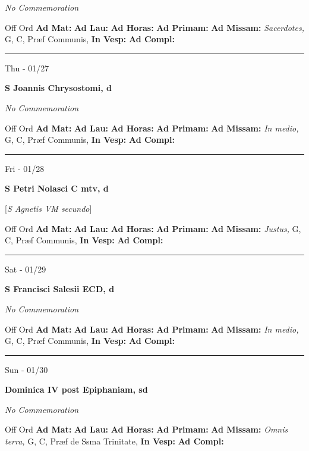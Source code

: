 \documentclass[letterpaper, 10pt]{article}
\begin{document}
\textit{No Commemoration}\begin{justify}
Off Ord
\textbf{Ad Mat: }
\textbf{Ad Lau: }
\textbf{Ad Horas: }
\textbf{Ad Primam: }
\textbf{Ad Missam:} \textit{Sacerdotes, } G, C, Præf Communis, 
\textbf{In Vesp: }
\textbf{Ad Compl: }\end{justify}



\hrule
\begin{center}
Thu - 01/27
\end{center}\textbf{ \large S Joannis Chrysostomi, \textnormal{\normalsize d}}

\textit{No Commemoration}\begin{justify}
Off Ord
\textbf{Ad Mat: }
\textbf{Ad Lau: }
\textbf{Ad Horas: }
\textbf{Ad Primam: }
\textbf{Ad Missam:} \textit{In medio, } G, C, Præf Communis, 
\textbf{In Vesp: }
\textbf{Ad Compl: }\end{justify}



\hrule
\begin{center}
Fri - 01/28
\end{center}\textbf{ \large S Petri Nolasci C mtv, \textnormal{\normalsize d}}

[\textit{S Agnetis VM secundo}]
\begin{justify}
Off Ord
\textbf{Ad Mat: }
\textbf{Ad Lau: }
\textbf{Ad Horas: }
\textbf{Ad Primam: }
\textbf{Ad Missam:} \textit{Justus, } G, C, Præf Communis, 
\textbf{In Vesp: }
\textbf{Ad Compl: }\end{justify}



\hrule
\begin{center}
Sat - 01/29
\end{center}\textbf{ \large S Francisci Salesii ECD, \textnormal{\normalsize d}}

\textit{No Commemoration}\begin{justify}
Off Ord
\textbf{Ad Mat: }
\textbf{Ad Lau: }
\textbf{Ad Horas: }
\textbf{Ad Primam: }
\textbf{Ad Missam:} \textit{In medio, } G, C, Præf Communis, 
\textbf{In Vesp: }
\textbf{Ad Compl: }\end{justify}



\hrule
\begin{center}
Sun - 01/30
\end{center}\textbf{ \large Dominica IV post Epiphaniam, \textnormal{\normalsize sd}}

\textit{No Commemoration}\begin{justify}
Off Ord
\textbf{Ad Mat: }
\textbf{Ad Lau: }
\textbf{Ad Horas: }
\textbf{Ad Primam: }
\textbf{Ad Missam:} \textit{Omnis terra, } G, C, Præf de Ssma Trinitate, 
\textbf{In Vesp: }
\textbf{Ad Compl: }\end{justify}
\end{document}
